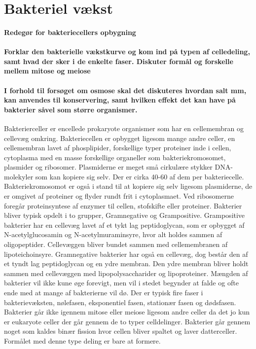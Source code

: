 \newpage
\part{Bakteriel vækst}
\subsection*{Redegør for bakteriecellers opbygning}
\subsection*{Forklar den bakterielle vækstkurve og kom ind på typen af celledeling, samt hvad der sker i de enkelte faser. Diskuter formål og forskelle mellem mitose og meiose}
\subsection*{I forhold til forsøget om osmose skal det diskuteres hvordan salt mm, kan anvendes til konservering, samt hvilken effekt det kan have på bakterier såvel som større organismer.}
Bakterierceller er encellede prokaryote organismer som har en cellemembran og cellevæg omkring. Bakteriecellen er opbygget ligesom mange andre celler, en cellemembran lavet af phosplipider, forskellige typer proteiner inde i cellen, cytoplasma med en masse forskellige organeller som bakteriekromosomet, plasmider og ribosomer. 
Plasmiderne er meget små cirkulære stykker DNA-molekyler som kan kopiere sig selv. Der er cirka 40-60 af dem per bakteriecelle. Bakteriekromosomot er også i stand til at kopiere sig selv ligesom plasmiderne, de er omgivet af proteiner og flyder rundt frit i cytoplasmaet. Ved ribosomerne foregår proteinsyntese af enzymer til cellen, stofskifte eller proteiner. 
Bakterier bliver typisk opdelt i to grupper, Gramnegative og Grampositive. Grampositive bakterier har en cellevæg lavet af et tykt lag peptidoglycan, som er opbygget af N-acetylglucosamin og N-acetylmuraminsyre, hvor alt holdes sammen af oligopeptider. Cellevæggen bliver bundet sammen med cellemembranen af lipoteichoinsyre. Gramnegative bakterier har også en cellevæg, dog består den af et tyndt lag peptidoglycan og en ydre membran. Den ydre membran bliver holdt sammen med cellevæggen med lipopolysaccharider og lipoproteiner.
Mængden af bakterier vil ikke kune øge forevigt, men vil i stedet begynder at falde og ofte ende med at mange af bakterierne vil dø. Der er typisk fire faser i bakterievæksten, nølefasen, eksponentiel fasen, stationær fasen og dødsfasen. Bakterier går ikke igennem mitose eller meiose ligesom andre celler da det jo kun er eukaryote celler der går gennem de to typer celldelinger. Bakterier går gennem noget som kaldes binær fission hvor cellen bliver spaltet og laver datterceller. Formålet med denne type deling er bare at formere.
